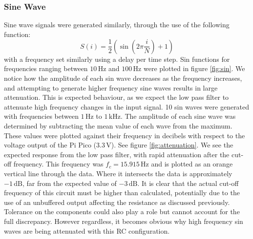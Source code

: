 \documentclass[%
 reprint,
 amsmath,amssymb,
 aps,
]{revtex4-2}
\begin{document}
        \subsubsection{Sine Wave}
        
        Sine wave signals were generated similarly, through the use of the following function:
        \begin{equation}
            S(i) = \frac{1}{2}\left(\sin\left(2\pi\frac{i}{N}\right) + 1\right)
        \end{equation}with a frequency set similarly using a delay per time step. Sin functions for frequencies ranging between $10\,\text{Hz}$ and $100\,\text{Hz}$ were plotted in figure \ref{fig:sin}. We notice how the amplitude of each sin wave decreases as the frequency increases, and attempting to generate higher frequency sine waves results in large attenuation. This is expected behaviour, as we expect the low pass filter to attenuate high frequency changes in the input signal. 10 sin waves were generated with frequencies between $1\,\text{Hz}$ to $1\,\text{kHz}$. The amplitude of each sine wave was determined by subtracting the mean value of each wave from the maximum. These values were plotted against their frequency in decibels with respect to the voltage output of the Pi Pico ($3.3\,\text{V}$). See figure \ref{fig:attenuation}. We see the expected response from the low pass filter, with rapid attenuation after the cut-off frequency. This frequency was $f_c = 15.915 \,\text{Hz}$ and is plotted as an orange vertical line through the data. Where it intersects the data is approximately $-1\,\text{dB}$, far from the expected value of $-3\,\text{dB}$. It is clear that the actual cut-off frequency of this circuit must be higher than calculated, potentially due to the use of an unbuffered output affecting the resistance as discussed previously. Tolerance on the components could also play a role but cannot account for the full discrepancy. However regardless, it becomes obvious why high frequency sin waves are being attenuated with this RC configuration.
\end{document}
